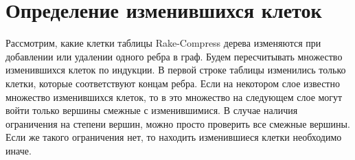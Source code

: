 \section{Определение изменившихся клеток}
\label{sec:changed}
Рассмотрим, какие клетки таблицы Rake-Compress дерева изменяются при добавлении или удалении одного ребра в граф. 
Будем пересчитывать множество изменившихся клеток по индукции.
В первой строке таблицы изменились только клетки, которые соответствуют концам ребра.  
Если на некотором слое известно множество изменившихся клеток, то в это множество на следующем слое могут войти только вершины смежные с изменившимися.
В случае наличия ограничения на степени вершин, можно просто проверить все смежные вершины. Если же такого ограничения нет, то находить изменившиеся клетки необходимо иначе.




\FloatBarrier
